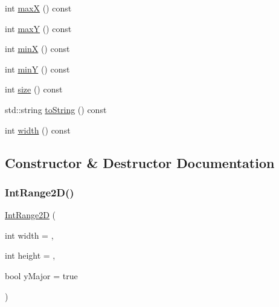 \begin{DoxyCompactItemize}
\item 
int \mbox{\hyperlink{classIntRange2D_aa9493e60175cb4e130ae4cfba2b55907}{maxX}} () const
\item 
int \mbox{\hyperlink{classIntRange2D_a015dcf4989cbafff40d5a345b9d9f959}{maxY}} () const
\item 
int \mbox{\hyperlink{classIntRange2D_a1a1724b4b31e3d3d251e5816c7d9e448}{minX}} () const
\item 
int \mbox{\hyperlink{classIntRange2D_a2337641dec44ff553785d9c143c3aafd}{minY}} () const
\item 
int \mbox{\hyperlink{classIntRange2D_af9593d4a5ff4274efaf429cb4f9e57cc}{size}} () const
\item 
std\+::string \mbox{\hyperlink{classIntRange2D_a1fe5121d6528fdea3f243321b3fa3a49}{to\+String}} () const
\item 
int \mbox{\hyperlink{classIntRange2D_ad72663daf610f2a0833a2fc3d78e4fdf}{width}} () const
\end{DoxyCompactItemize}


\subsection{Constructor \& Destructor Documentation}
\mbox{\label{classIntRange2D_a39f2016ab50300a0d0e76d60fe958356}} 
\subsubsection{\texorpdfstring{Int\+Range2\+D()}{IntRange2D()}\hspace{0.1cm}{\footnotesize\ttfamily [1/2]}}
{\footnotesize\ttfamily \mbox{\hyperlink{classIntRange2D}{Int\+Range2D}} (\begin{DoxyParamCaption}\item[{int}]{width = {},  }\item[{int}]{height = {},  }\item[{bool}]{y\+Major = {\ttfamily true} }\end{DoxyParamCaption})}

\mbox{\label{classIntRange2D_a22f22b7ce16863ba7acc111a2b26018b}} 
